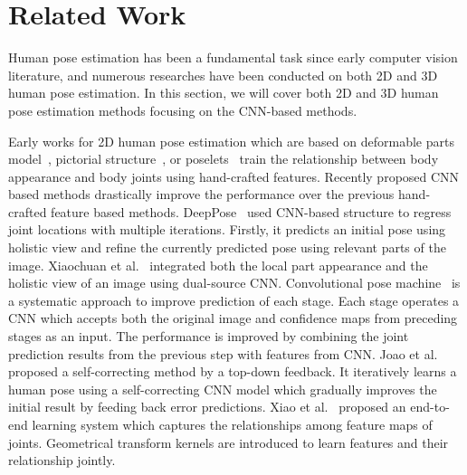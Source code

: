 \documentclass[runningheads]{llncs}
\begin{document}
\section{Related Work}
\label{sec:rel}
Human pose estimation has been a fundamental task since early computer vision literature, and numerous researches have been conducted on both 2D and 3D human pose estimation. In this section, we will cover both 2D and 3D human pose estimation methods focusing on the CNN-based methods.

Early works for 2D human pose estimation which are based on deformable parts model~\cite{felzenszwalb2005pictorial}, pictorial structure~\cite{andriluka2009pictorial,dantone2013human,yang2011articulated}, or poselets~\cite{bourdev2009poselets} train the relationship between body appearance and body joints using hand-crafted features. Recently proposed CNN based methods drastically improve the performance over the previous hand-crafted feature based methods. DeepPose~\cite{toshev2014deeppose} used CNN-based structure to regress joint locations with multiple iterations. Firstly, it predicts an initial pose using holistic view and refine the currently predicted pose using relevant parts of the image. Xiaochuan et al.~\cite{fan2015combining} integrated both the local part appearance and the holistic view of an image using dual-source CNN. Convolutional pose machine~\cite{wei2016convolutional} is a systematic approach to improve prediction of each stage. Each stage operates a CNN which accepts both the original image and confidence maps from preceding stages as an input. The performance is improved by combining the joint prediction results from the previous step with features from CNN. Joao et al.~\cite{carreira2015human} proposed a self-correcting method by a top-down feedback. It iteratively learns a human pose using a self-correcting CNN model which gradually improves the initial result by feeding back error predictions. Xiao et al.~\cite{chu2016structured} proposed an end-to-end learning system which captures the relationships among feature maps of joints. Geometrical transform kernels are introduced to learn features and their relationship jointly.
\end{document}
